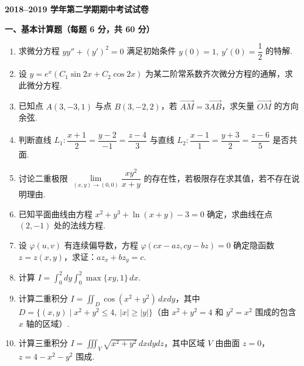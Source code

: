 \documentclass[a4paper,11pt]{ctexart}
\begin{document}
\begin{center}
  {\Large\bfseries 2018--2019 学年第二学期期中考试试卷}
\end{center}

\vspace{0.6em}

\textbf{一、基本计算题（每题 6 分，共 60 分）}

\begin{enumerate}[label=\arabic*., leftmargin=2em, itemsep=0.9em, topsep=0.6em]
  \item 求微分方程 $yy'' + (y')^2 = 0$ 满足初始条件 $y(0) = 1,\ y'(0) = \dfrac{1}{2}$ 的特解.

  \item 设 $y = e^x(C_1\sin 2x + C_2\cos 2x)$ 为某二阶常系数齐次微分方程的通解，求此微分方程.

  \item 已知点 $A(3,-3,1)$ 与点 $B(3,-2,2)$，若 $\overrightarrow{AM} = 3\overrightarrow{AB}$，求矢量 $\overrightarrow{OM}$ 的方向余弦.

  \item 判断直线 $L_1: \dfrac{x+1}{2} = \dfrac{y-2}{-1} = \dfrac{z-4}{3}$ 与直线 $L_2: \dfrac{x-1}{1} = \dfrac{y+3}{2} = \dfrac{z-6}{5}$ 是否共面.

  \item 讨论二重极限 $\lim\limits_{(x,y)\to(0,0)} \dfrac{xy^2}{x+y}$ 的存在性，若极限存在求其值，若不存在说明理由.

  \item 已知平面曲线由方程 $x^2 + y^3 + \ln(x+y) - 3 = 0$ 确定，求曲线在点 $(2,-1)$ 处的法线方程.

  \item 设 $\varphi(u,v)$ 有连续偏导数，方程 $\varphi(cx - az, cy - bz) = 0$ 确定隐函数 $z = z(x,y)$，求证：$az_x + bz_y = c$.

  \item 计算 $I = \displaystyle\int_0^2 dy \int_0^2 \max\{xy, 1\}\,dx$.

  \item 计算二重积分 $I = \displaystyle\iint_D \cos(x^2+y^2)\,dxdy$，其中 $D = \{(x,y)\mid x^2+y^2 \le 4,\ |x| \ge |y|\}$（由 $x^2+y^2=4$ 和 $y^2=x^2$ 围成的包含 $x$ 轴的区域）.

  \item 计算三重积分 $I = \displaystyle\iiint_V \sqrt{x^2+y^2}\,dxdydz$，其中区域 $V$ 由曲面 $z=0$，$z = 4 - x^2 - y^2$ 围成.
\end{enumerate}

\vspace{0.8em}
\end{document}
